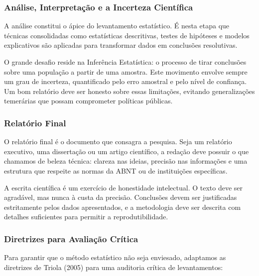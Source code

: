 \subsubsection{Análise, Interpretação e a Incerteza Científica}

A análise constitui o ápice do levantamento estatístico. É nesta etapa que técnicas consolidadas como estatísticas descritivas, testes de hipóteses e modelos explicativos são aplicadas para transformar dados em conclusões resolutivas. \vskip0.3cm

O grande desafio reside na Inferência Estatística: o processo de tirar conclusões sobre uma população a partir de uma amostra. Este movimento envolve sempre um grau de incerteza, quantificado pelo erro amostral e pelo nível de confiança. Um bom relatório deve ser honesto sobre essas limitações, evitando generalizações temerárias que possam comprometer políticas públicas.


\newpage
\subsubsection{Relatório Final}

O relatório final é o documento que consagra a pesquisa. Seja um relatório executivo, uma dissertação ou um artigo científico, a redação deve possuir o que chamamos de beleza técnica: clareza nas ideias, precisão nas informações e uma estrutura que respeite as normas da ABNT ou de instituições específicas. \vskip0.3cm

A escrita científica é um exercício de honestidade intelectual. O texto deve ser agradável, mas nunca à custa da precisão. Conclusões devem ser justificadas estritamente pelos dados apresentados, e a metodologia deve ser descrita com detalhes suficientes para permitir a reprodutibilidade.


\subsubsection{Diretrizes para Avaliação Crítica}

Para garantir que o método estatístico não seja enviesado, adaptamos as diretrizes de Triola (2005) para uma auditoria crítica de levantamentos:


